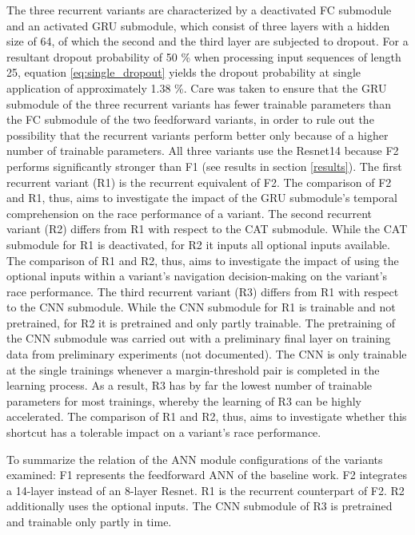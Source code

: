 The three recurrent variants
are characterized by a deactivated FC submodule and 
an activated GRU submodule,
which consist of three layers
with a hidden size of 64,
of which the second and the third layer
are subjected to dropout.
For a resultant dropout probability of 50 \%
when processing input sequences of length 25,
equation \ref{eq:single_dropout} yields the dropout probability 
at single application of approximately 1.38 \%.
Care was taken to ensure that the GRU submodule 
of the three recurrent variants has fewer trainable parameters
than the FC submodule of the two feedforward variants,
in order to rule out the possibility 
that the recurrent variants perform better only 
because of a higher number of trainable parameters.
All three variants use the Resnet14 
because F2 performs significantly stronger than F1
(see results in section \ref{results}).
The first recurrent variant (R1)
is the recurrent equivalent of F2.
The comparison of F2 and R1, thus,
aims to investigate the impact of the GRU submodule's 
temporal comprehension on the race performance of a variant.
The second recurrent variant (R2) differs 
from R1 with respect to the CAT submodule.
While the CAT submodule for R1 is deactivated,
for R2 it inputs
all optional inputs available.
The comparison of R1 and R2, thus,
aims to investigate the impact of 
using the optional inputs
within a variant's navigation decision-making
on the variant's race performance.
The third recurrent variant (R3) differs 
from R1 with respect to the CNN submodule.
While the CNN submodule for R1 is trainable and not pretrained,
for R2 it is pretrained and only partly trainable.
The pretraining of the CNN submodule
was carried out with a preliminary final layer
on training data from 
preliminary experiments (not documented).
The CNN is only trainable at the single trainings
whenever a margin-threshold pair is completed in the learning process.
As a result, R3 has by far the lowest number of trainable parameters
for most trainings, whereby 
the learning of R3 can be highly accelerated.
The comparison of R1 and R2, thus,
aims to investigate 
whether this shortcut
has a tolerable impact on a
variant's race performance.

To summarize the relation of the ANN module configurations of the variants examined: 
F1 represents the feedforward ANN of the baseline work.
F2 integrates a 14-layer instead of an 8-layer Resnet.
R1 is the recurrent counterpart of F2.
R2 additionally uses the optional inputs.
The CNN submodule of R3 is pretrained  
and trainable only partly in time.

